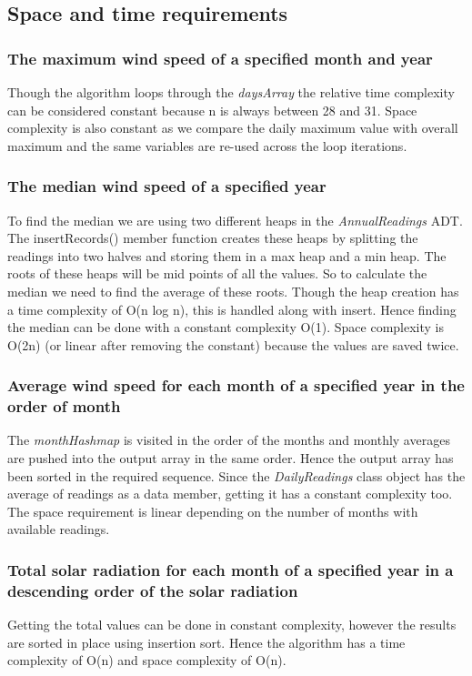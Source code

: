 \documentclass[12pt]{article}
\begin{document}
\subsection{Space and time requirements}
\subsubsection{The maximum wind speed of a specified month and year}
Though the algorithm loops through the {\em daysArray} the relative time complexity can be considered constant because n is always between 28 and 31. Space complexity is also constant as we compare the daily maximum value with overall maximum and the same variables are re-used across the loop iterations.
\subsubsection{The median wind speed of a specified year}
To find the median we are using two different heaps in the {\em AnnualReadings} ADT. The insertRecords() member function creates these heaps by splitting the readings into two halves and storing them in a max heap and a min heap. The roots of these heaps will be mid points of all the values. So to calculate the median we need to find the average of these roots. Though the heap creation has a time complexity of O(n log n), this is handled along with insert. Hence finding the median can be done with a constant complexity O(1). Space complexity is O(2n) (or linear after removing the constant) because the values are saved twice.
\subsubsection{Average wind speed for each month of a specified year in the order of month}
The {\em monthHashmap} is visited in the order of the months and monthly averages are pushed into the output array in the same order. Hence the output array has been sorted in the required sequence. Since the {\em DailyReadings} class object has the average of readings as a data member, getting it has a constant complexity too. The space requirement is linear depending on the number of months with available readings.
\subsubsection{Total solar radiation for each month of a specified year in a descending order of the solar radiation}
Getting the total values can be done in constant complexity, however the results are sorted in place using insertion sort. Hence the algorithm has a time complexity of O(n) and space complexity of O(n).
\end{document}
